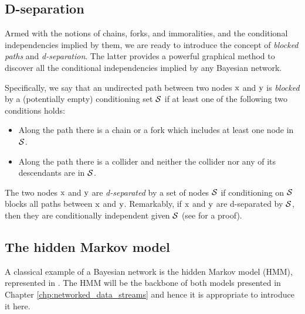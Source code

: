 \subsection{D-separation}
\label{sec:d_separation}
Armed with the notions of chains, forks, and immoralities, and the conditional independencies implied by them, we are ready to introduce the concept of \emph{blocked paths} and \emph{d-separation}. The latter provides a powerful graphical method to discover all the conditional independencies implied by any Bayesian network.

Specifically, we say that an undirected path between two nodes ${\textnormal{x}}$ and ${\textnormal{y}}$ is \emph{blocked} by a (potentially empty) conditioning set ${\mathcal{S}}$ if at least one of the following two conditions holds:
\begin{itemize}
    \item Along the path there is a chain or a fork which includes at least one node in ${\mathcal{S}}$.
    \item Along the path there is a collider and neither the collider nor any of its descendants are in ${\mathcal{S}}$.
\end{itemize}
The two nodes ${\textnormal{x}}$ and ${\textnormal{y}}$ are \emph{d-separated} by a set of nodes ${\mathcal{S}}$ if conditioning on ${\mathcal{S}}$ blocks all paths between ${\textnormal{x}}$ and ${\textnormal{y}}$. Remarkably, if ${\textnormal{x}}$ and ${\textnormal{y}}$ are d-separated by ${\mathcal{S}}$, then they are conditionally independent given ${\mathcal{S}}$ (see \citet{Koller2009} for a proof).

\subsection{The hidden Markov model}
\label{sec:hmm}
A classical example of a Bayesian network is the hidden Markov model (HMM), represented in . The HMM will be the backbone of both models presented in Chapter \ref{chp:networked_data_streams} and hence it is appropriate to introduce it here.

